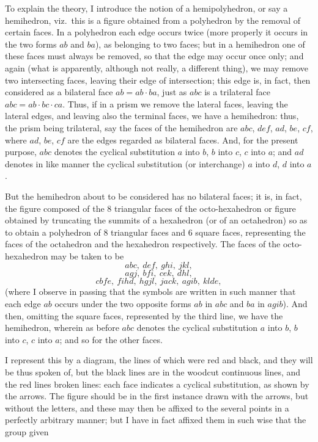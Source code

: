 \documentclass[11pt,a4paper]{article}
\begin{document}
\newpage


To explain the theory, I introduce the notion of a hemipolyhedron, or say a hemihedron, viz.\ this is a figure obtained from a polyhedron by the removal of certain faces. In a polyhedron each edge occurs twice (more properly it occurs in the two forms $ab$ and $ba$), as belonging to two faces; but in a hemihedron one of these faces must always be removed, so that the edge may occur once only; and again (what is apparently, although not really, a different thing), we may remove two intersecting faces, leaving their edge of intersection; this edge is, in fact, then considered as a bilateral face $ab = ab\cdot ba$, just as $abc$ is a trilateral face $abc = ab\cdot bc\cdot ca$. Thus, if in a prism we remove the lateral faces, leaving the lateral edges, and leaving also the terminal faces, we have a hemihedron: thus, the prism being trilateral, say the faces of the hemihedron are $abc$, $def$, $ad$, $be$, $cf$, where $ad$, $be$, $cf$ are the edges regarded as bilateral faces. And, for the present purpose, $abc$ denotes the cyclical substitution $a$ into $b$, $b$ into $c$, $c$ into $a$; and $ad$ denotes in like manner the cyclical substitution (or interchange) $a$ into $d$, $d$ into $a$.

\medskip

But the hemihedron about to be considered has no bilateral faces; it is, in fact, the figure composed of the 8 triangular faces of the octo-hexahedron or figure obtained by truncating the summits of a hexahedron (or of an octahedron) so as to obtain a polyhedron of 8 triangular faces and 6 square faces, representing the faces of the octahedron and the hexahedron respectively. The faces of the octo-hexahedron may be taken to be
\[
abc,\ def,\ ghi,\ jkl,
\]
\[
agj,\ bfi,\ cek,\ dhl,
\]
\[
cbfe,\ fihd,\ hgjl,\ jack,\ agib,\ klde,
\]
(where I observe in passing that the symbols are written in such manner that each edge $ab$ occurs under the two opposite forms $ab$ in $abc$ and $ba$ in $agib$). And then, omitting the square faces, represented by the third line, we have the hemihedron, wherein as before $abc$ denotes the cyclical substitution $a$ into $b$, $b$ into $c$, $c$ into $a$; and so for the other faces.

\medskip

I represent this by a diagram, the lines of which were red and black, and they will be thus spoken of, but the black lines are in the woodcut continuous lines, and the red lines broken lines: each face indicates a cyclical substitution, as shown by the arrows. The figure should be in the first instance drawn with the arrows, but without the letters, and these may then be affixed to the several points in a perfectly arbitrary manner; but I have in fact affixed them in such wise that the group given
\end{document}
